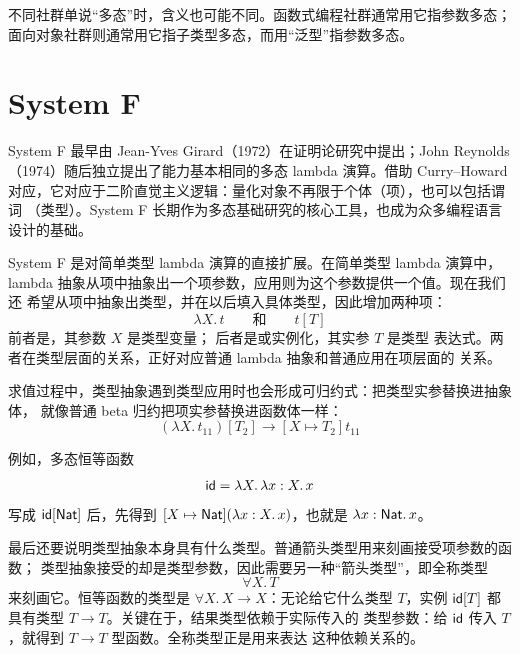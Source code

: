 不同社群单说“多态”时，含义也可能不同。函数式编程社群通常用它指参数多态；
面向对象社群则通常用它指子类型多态，而用“泛型”指参数多态。

\section{System F}
\label{sec:23.3}

System F 最早由 Jean-Yves Girard（1972）在证明论研究中提出；John Reynolds
（1974）随后独立提出了能力基本相同的多态 lambda 演算。借助 Curry--Howard
对应，它对应于二阶直觉主义逻辑：量化对象不再限于个体（项），也可以包括谓词
（类型）。System F 长期作为多态基础研究的核心工具，也成为众多编程语言设计的基础。

System F 是对简单类型 lambda 演算的直接扩展。在简单类型 lambda 演算中，
lambda 抽象从项中抽象出一个项参数，应用则为这个参数提供一个值。现在我们还
希望从项中抽象出类型，并在以后填入具体类型，因此增加两种项：
\[
\lambda X.\,t
\qquad\text{和}\qquad
t[T]
\]
前者是，其参数 \(X\) 是类型变量；
后者是或实例化，其实参 \(T\) 是类型
表达式。两者在类型层面的关系，正好对应普通 lambda 抽象和普通应用在项层面的
关系。

求值过程中，类型抽象遇到类型应用时也会形成可归约式：把类型实参替换进抽象体，
就像普通 beta 归约把项实参替换进函数体一样：
\[
(\lambda X.\,t_{11})[T_2]\longrightarrow[X\mapsto T_2]t_{11}
\]

例如，多态恒等函数
\[
\mathsf{id}=\lambda X.\,\lambda x:X.\,x
\]
写成 \(\mathsf{id}[\mathsf{Nat}]\) 后，先得到
\([X\mapsto\mathsf{Nat}](\lambda x:X.\,x)\)，也就是
\(\lambda x:\mathsf{Nat}.\,x\)。

最后还要说明类型抽象本身具有什么类型。普通箭头类型用来刻画接受项参数的函数；
类型抽象接受的却是类型参数，因此需要另一种“箭头类型”，即全称类型
\[
\forall X.\,T
\]
来刻画它。恒等函数的类型是
\(\forall X.\,X\to X\)：无论给它什么类型 \(T\)，实例
\(\mathsf{id}[T]\) 都具有类型 \(T\to T\)。关键在于，结果类型依赖于实际传入的
类型参数：给 \(\mathsf{id}\) 传入 \(T\)，就得到 \(T\to T\) 型函数。全称类型正是用来表达
这种依赖关系的。

